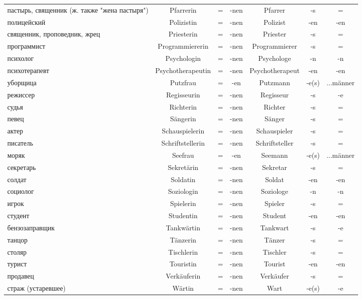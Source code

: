 \begin{longtable}{|p{4cm}|c|c|c|c|c|c|}
 пастырь, священник (ж. также "жена пастыря") & Pfarrerin & = & -nen & Pfarrer & -s & = \\
 полицейский & Polizistin & = & -nen & Polizist & -en & -en \\
 священник, проповедник, жрец & Priesterin & = & -nen & Priester & -s & = \\
 программист & Programmiererin & = & -nen & Programmierer & -s & = \\
 психолог & Psychologin & = & -nen & Psychologe & -n & -n \\
 психотерапевт & Psychotherapeutin & = & -nen & Psychotherapeut & -en & -en \\
 уборщица & Putzfrau & = & -en & Putzmann & -e(s) & ...m\"anner \\
 режиссер & Regisseurin & = & -nen & Regisseur & -s & -e \\
 судья & Richterin & = & -nen & Richter & -s & = \\
 певец & S\"angerin & = & -nen & S\"anger & -s & = \\
 актер & Schauspielerin & = & -nen & Schauspieler & -s & = \\
 писатель & Schriftstellerin & = & -nen & Schriftsteller & -s & = \\
 моряк & Seefrau & = & -en & Seemann & -e(s) & ...m\"anner \\
 секретарь & Sekret\"arin & = & -nen & Sekretar & -s & = \\
 солдат & Soldatin & = & -nen & Soldat & -en & -en \\
 социолог & Soziologin & = & -nen & Soziologe & -n & -n \\
 игрок & Spielerin & = & -nen & Spieler & -s & = \\
 студент & Studentin & = & -nen & Student & -en & -en \\
 бензозаправщик & Tankw\"artin & = & -nen & Tankwart & -s & -e \\
 танцор & T\"anzerin & = & -nen & T\"anzer & -s & = \\
 столяр & Tischlerin & = & -nen & Tischler & -s & = \\
 турист & Touristin & = & -nen & Tourist & -en & -en \\
 продавец & Verk\"auferin & = & -nen & Verk\"aufer & -s & = \\
 страж (устаревшее) & W\"artin & = & -nen & Wart & -e(s) & -e \\
\hline
\end{longtable}
